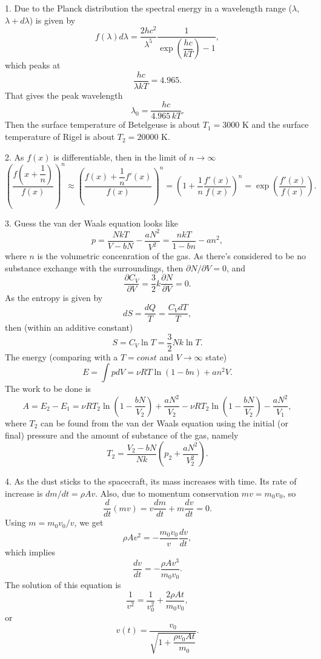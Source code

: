 \documentclass[12pt,a4paper,pdflatex]{disser}
\begin{document}
1. Due to the Planck distribution the spectral energy in a wavelength range ($\lambda$, $\lambda+d\lambda$) is given by
$$
  f(\lambda)d\lambda=\frac{2hc^2}{\lambda^5}\frac{1}{\exp\left(\dfrac{hc}{kT}\right)-1},
$$
which peaks at
$$
  \frac{hc}{\lambda kT}=4.965.
$$
That gives the peak wavelength
$$
  \lambda_0=\frac{hc}{4.965\,kT}.
$$
Then the surface temperature of Betelgeuse is about $T_1=3000$ K and the surface temperature of Rigel is about $T_2=20000$ K.

2. As $f(x)$ is differentiable, then in the limit of $n\to\infty$
$$
  \left(\frac{f\left(x+\dfrac{1}{n}\right)}{f(x)}\right)^n\approx\left(\frac{f(x)+\dfrac{1}{n}f'(x)}{f(x)}\right)^n=\left(1+\frac{1}{n}\frac{f'(x)}{f(x)}\right)^n=\exp\left(\frac{f'(x)}{f(x)}\right).
$$

3. Guess the van der Waals equation looks like
$$
  p=\frac{NkT}{V-bN}-\frac{aN^2}{V^2}=\frac{nkT}{1-bn}-an^2,
$$
where $n$ is the volumetric concenration of the gas. As there's considered to be no substance exchange with the surroundings, then $\partial N/\partial V=0$, and
$$
  \frac{\partial C_V}{\partial V}=\frac{3}{2}k\frac{\partial N}{\partial V}=0.
$$
As the entropy is given by
$$
  dS=\frac{dQ}{T}=\frac{C_V dT}{T},
$$
then (within an additive constant)
$$
  S=C_V \ln T=\frac32 Nk\ln T.
$$
The energy (comparing with a $T=const$ and $V\to\infty$ state)
$$
  E=\int pdV=\nu RT \ln(1-bn)+an^2 V.
$$
The work to be done is
$$
  A=E_{2}-E_{1}=\nu RT_2 \ln\left(1-\frac{bN}{V_2}\right)+\frac{aN^2}{V_2}-\nu RT_2 \ln\left(1-\frac{bN}{V_2}\right)-\frac{aN^2}{V_1},
$$
where $T_2$ can be found from the van der Waals equation using the initial (or final) pressure and the amount of substance of the gas, namely
$$
  T_2=\frac{V_2-bN}{Nk}\left(p_2+\frac{aN^2}{V_2^2}\right).
$$

4. As the dust sticks to the spacecraft, its mass increases with time. Its rate of increase is $dm/dt=\rho Av$. Also, due to momentum conservation $mv=m_0 v_0$, so
$$
  \frac{d}{dt}(mv)=v\frac{dm}{dt}+m\frac{dv}{dt}=0.
$$
Using $m=m_0 v_0/v$, we get
$$
  \rho Av^2=-\frac{m_0 v_0}{v}\frac{dv}{dt},
$$
which implies
$$
  \frac{dv}{dt}=-\frac{\rho Av^3}{m_0 v_0}.
$$
The solution of this equation is
$$
  \frac{1}{v^2}=\frac{1}{v_0^2}+\frac{2\rho At}{m_0 v_0},
$$
or
$$
  v(t)=\frac{v_0}{\sqrt{1+\dfrac{\rho v_0 At}{m_0}}}.
$$
\end{document}
